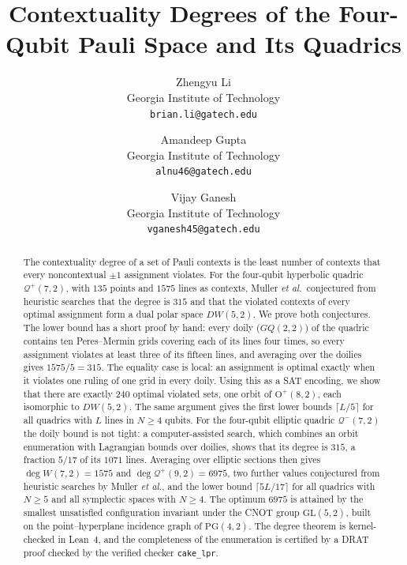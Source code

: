 \documentclass[11pt]{article}
\title{Contextuality Degrees of the Four-Qubit Pauli Space and Its Quadrics}
\author{
  Zhengyu Li\\
  Georgia Institute of Technology\\
  \texttt{brian.li@gatech.edu}
  \and
  Amandeep Gupta\\
  Georgia Institute of Technology\\
  \texttt{alnu46@gatech.edu}
  \and
  Vijay Ganesh\\
  Georgia Institute of Technology\\
  \texttt{vganesh45@gatech.edu}
}
\date{}
\theoremstyle{definition}
\theoremstyle{remark}
\newcommand{\Qp}{\mathcal{Q}^{+}}
\newcommand{\Qm}{\mathcal{Q}^{-}}
\newcommand{\dg}{\operatorname{deg}}
\newcommand{\GO}{\mathrm{O}}
\begin{document}
\maketitle

\begin{abstract}
The contextuality degree of a set of Pauli contexts is the least number of contexts that every noncontextual $\pm1$ assignment violates.
For the four-qubit hyperbolic quadric $\Qp(7,2)$, with $135$ points and $1575$ lines as contexts, Muller \emph{et al.}\ conjectured from heuristic searches that the degree is $315$ and that the violated contexts of every optimal assignment form a dual polar space $DW(5,2)$.
We prove both conjectures.
The lower bound has a short proof by hand: every doily ($GQ(2,2)$) of the quadric contains ten Peres--Mermin grids covering each of its lines four times, so every assignment violates at least three of its fifteen lines, and averaging over the doilies gives $1575/5=315$.
The equality case is local: an assignment is optimal exactly when it violates one ruling of one grid in every doily.
Using this as a SAT encoding, we show that there are exactly $240$ optimal violated sets, one orbit of $\GO^+(8,2)$, each isomorphic to $DW(5,2)$.
The same argument gives the first lower bounds $\lceil L/5\rceil$ for all quadrics with $L$ lines in $N\ge4$ qubits.
For the four-qubit elliptic quadric $\Qm(7,2)$ the doily bound is not tight: a computer-assisted search, which combines an orbit enumeration with Lagrangian bounds over doilies, shows that its degree is $315$, a fraction $5/17$ of its $1071$ lines. Averaging over elliptic sections then gives $\dg W(7,2)=1575$ and $\dg\Qp(9,2)=6975$, two further values conjectured from heuristic searches by Muller \emph{et al.}, and the lower bound $\lceil 5L/17\rceil$ for all quadrics with $N\ge5$ and all symplectic spaces with $N\ge4$. The optimum $6975$ is attained by the smallest unsatisfied configuration invariant under the CNOT group $\mathrm{GL}(5,2)$, built on the point--hyperplane incidence graph of $\mathrm{PG}(4,2)$.
The degree theorem is kernel-checked in Lean~4, and the completeness of the enumeration is certified by a DRAT proof checked by the verified checker \texttt{cake\_lpr}.
\end{abstract}
\end{document}
